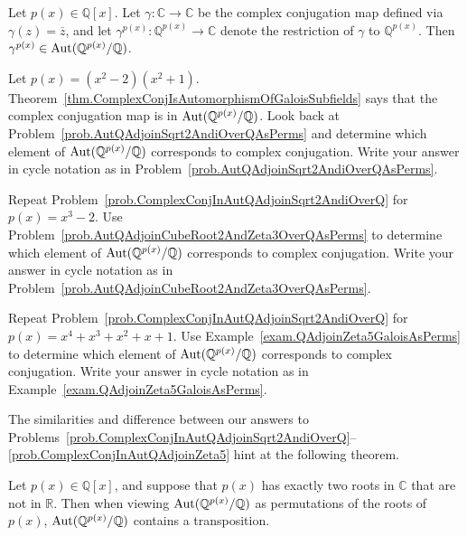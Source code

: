 \begin{theorem}\label{thm.ComplexConjIsAutomorphismOfGaloisSubfields}
Let $p(x) \in \mathbb{Q}[x]$. Let $\gamma: \mathbb{C}\rightarrow \mathbb{C}$ be the complex conjugation map defined via $\gamma(z) = \overline{z}$, and let $\gamma^{p(x)}: \mathbb{Q}^{p(x)}\rightarrow \mathbb{C}$ denote the restriction of $\gamma$ to $\mathbb{Q}^{p(x)}$. Then $\gamma^{p(x)} \in \operatorname{Aut}(\mathbb{Q}^{p(x)}/\mathbb{Q})$.
\end{theorem}

\begin{problem}\label{prob.ComplexConjInAutQAdjoinSqrt2AndiOverQ}
Let $p(x) = (x^2-2)(x^2+1)$. Theorem~\ref{thm.ComplexConjIsAutomorphismOfGaloisSubfields} says that the complex conjugation map is in $\operatorname{Aut}(\mathbb{Q}^{p(x)}/\mathbb{Q})$. Look back at Problem~\ref{prob.AutQAdjoinSqrt2AndiOverQAsPerms} and determine which element of $\operatorname{Aut}(\mathbb{Q}^{p(x)}/\mathbb{Q})$ corresponds to complex conjugation. Write your answer in cycle notation as in Problem~\ref{prob.AutQAdjoinSqrt2AndiOverQAsPerms}.
\end{problem}

\begin{problem}\label{prob.ComplexConjInAutQAdjoinCubeRoot2AndZeta3OverQ}
Repeat Problem~\ref{prob.ComplexConjInAutQAdjoinSqrt2AndiOverQ} for $p(x) = x^3-2$. Use Problem~\ref{prob.AutQAdjoinCubeRoot2AndZeta3OverQAsPerms} to determine which element of $\operatorname{Aut}(\mathbb{Q}^{p(x)}/\mathbb{Q})$ corresponds to complex conjugation.  Write your answer in cycle notation as in Problem~\ref{prob.AutQAdjoinCubeRoot2AndZeta3OverQAsPerms}.
\end{problem}

\begin{problem}\label{prob.ComplexConjInAutQAdjoinZeta5}
Repeat Problem~\ref{prob.ComplexConjInAutQAdjoinSqrt2AndiOverQ} for $p(x) = x^4+x^3+x^2+x+1$. Use Example~\ref{exam.QAdjoinZeta5GaloisAsPerms} to determine which element of $\operatorname{Aut}(\mathbb{Q}^{p(x)}/\mathbb{Q})$ corresponds to complex conjugation. Write your answer in cycle notation as in Example~\ref{exam.QAdjoinZeta5GaloisAsPerms}.
\end{problem}

The similarities and difference between our answers to Problems~\ref{prob.ComplexConjInAutQAdjoinSqrt2AndiOverQ}--\ref{prob.ComplexConjInAutQAdjoinZeta5}  hint at the following theorem.

\begin{theorem}\label{thm.PolyWithOnlyTwoComplexRootsYieldsTransposition}
Let $p(x) \in \mathbb{Q}[x]$, and suppose that $p(x)$ has exactly two roots in $\mathbb{C}$ that are not in $\mathbb{R}$. Then when viewing $\operatorname{Aut}(\mathbb{Q}^{p(x)}/\mathbb{Q})$ as permutations of the roots of $p(x)$, $\operatorname{Aut}(\mathbb{Q}^{p(x)}/\mathbb{Q})$ contains a transposition.
\end{theorem}

